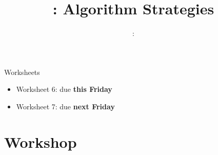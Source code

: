 \usepackage{../../beamerthemeFalmouthGamesAcademy}
\graphicspath{ {../../} }

\lstset{language=[Sharp]C
}

\usepackage[normalem]{ulem}
\usepackage{wasysym}

\usepackage{pdfpages}

\usepackage{algpseudocode}
\usepackage{qtree}

\usetikzlibrary{arrows,automata}
\usetikzlibrary{tikzmark,calc}




\title{\sessionnumber: Algorithm Strategies}
\subtitle{\modulecode: \moduletitle}

\frame{\titlepage} 

\begin{frame}{Worksheets}
	\begin{itemize}
		\item Worksheet 6: due \textbf{this Friday}
		\item Worksheet 7: due \textbf{next Friday}
	\end{itemize}
\end{frame}






\part{Workshop}
\frame{\partpage}


